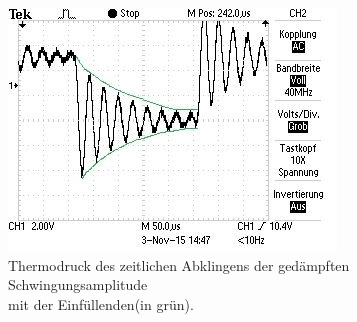 \begin{figure}
\centering
\includegraphics{Thermo.jpg}
\caption{Thermodruck des zeitlichen Abklingens der gedämpften Schwingungsamplitude\\ mit der Einfüllenden(in grün).}
\label{fig:thermodruck}
\end{figure}
\newpage
